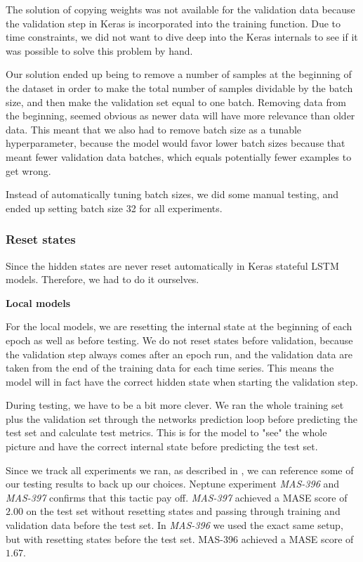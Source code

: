 The solution of copying weights was not available for the validation data
because the validation step in Keras is incorporated into the training function.
Due to time constraints, we did not want to dive deep into the Keras internals
to see if it was possible to solve this problem by hand.

Our solution ended up being to remove a number of samples at the beginning of
the dataset in order to make the total number of samples dividable by the batch size,
and then make the validation set equal to one batch. Removing data from the beginning,
seemed obvious as newer data will have more relevance than older data.
This meant that we also had to remove batch size as a tunable hyperparameter,
because the model would favor lower batch sizes because that meant fewer validation data batches,
which equals potentially fewer examples to get wrong.

Instead of automatically tuning batch sizes, we did some manual testing, and
ended up setting batch size 32 for all experiments.


\subsubsection{Reset states}
\label{section:Method:lstm-reset-hidden-states}
Since  the hidden states are never reset automatically in Keras stateful LSTM models.
Therefore, we had to do it ourselves.

\textbf{Local models}

For the local models, we are resetting the internal state at the beginning
of each epoch as well as before testing. We do not reset states before validation,
because the validation step always comes after an epoch run, and the
validation data are taken from the end of the training data for each time series.
This means the model will in fact have the correct hidden state when starting the validation step.

During testing, we have to be a bit more clever. We ran the whole training set plus
the validation set through the networks prediction loop before predicting the test
set and calculate test metrics.
This is for the model to "see" the whole picture and have the correct
internal state before predicting the test set.

Since we track all experiments we ran, as described in ,
we can reference some of our testing results to back up our choices.
Neptune experiment \textit{MAS-396} and \textit{MAS-397} confirms
that this tactic pay off. \textit{MAS-397} achieved a MASE score of $2.00$ on the test set
without resetting states and passing through training and validation data before
the test set. In \textit{MAS-396} we used the exact same setup, but with resetting states
before the test set. MAS-396 achieved a MASE score of $1.67$.


